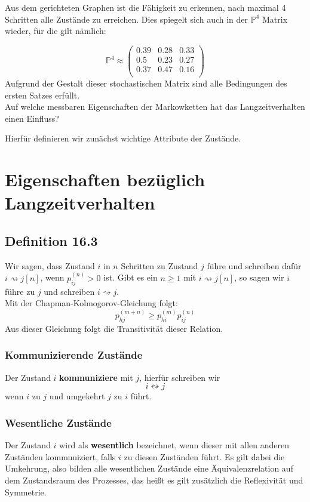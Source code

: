 \documentclass[a4paper]{article}
\begin{document}
Aus dem gerichteten Graphen ist die Fähigkeit zu erkennen, nach maximal 4 Schritten alle Zustände
zu erreichen.
Dies spiegelt sich auch in der $\mathbb{P} ^{4}$ Matrix wieder, für die gilt nämlich:

\[
	\mathbb{P} ^{4} \approx \begin{pmatrix} 
		0.39 & 0.28 & 0.33 \\
		0.5 & 0.23 & 0.27 \\
		0.37 & 0.47 & 0.16 \\
	\end{pmatrix} 
\]
Aufgrund der Gestalt dieser stochastischen Matrix sind alle Bedingungen des ersten Satzes erfüllt.
\\

Auf welche messbaren Eigenschaften der Markowketten hat das Langzeitverhalten einen Einfluss?

Hierfür definieren wir zunächst wichtige Attribute der Zustände.

\section{Eigenschaften bezüglich Langzeitverhalten}

\subsection{Definition 16.3}

Wir sagen, dass Zustand $i$ in $n$ Schritten zu Zustand $j$ führe und schreiben
dafür $i \rightsquigarrow j [n] $, wenn $p_{ij} ^{(n)} > 0$ ist.
Gibt es ein $n \geq 1$ mit $i \rightsquigarrow j [n]$, so sagen wir $i$ führe
zu $j$ und schreiben $i \rightsquigarrow j$.
\\

Mit der Chapman-Kolmogorov-Gleichung folgt:
\[
p_{hj} ^{(m+n)} \geq p_{hi} ^{(m)} p_{ij} ^{(n)}
\] 
Aus dieser Gleichung folgt die Transitivität dieser Relation.

\subsubsection{Kommunizierende Zustände}

Der Zustand $i$ \textbf{kommuniziere}  mit $j$, hierfür schreiben wir
\[
i \leftrightsquigarrow j
\] 
wenn $i$ zu $j$ und umgekehrt $j$ zu $i$
führt.

\subsubsection{Wesentliche Zustände}
Der Zustand $i$ wird als \textbf{wesentlich}  bezeichnet, wenn dieser mit allen anderen Zuständen
kommuniziert, falls $i$ zu diesen Zuständen führt. Es gilt dabei die Umkehrung, also bilden alle
wesentlichen Zustände eine Äquivalenzrelation auf dem Zustandsraum des Prozesses, das heißt es
gilt zusätzlich die Reflexivität und Symmetrie.
\end{document}
